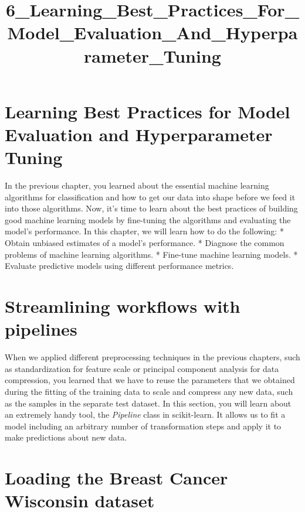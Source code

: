 \documentclass[11pt]{article}
\title{6\_Learning\_Best\_Practices\_For\_Model\_Evaluation\_And\_Hyperparameter\_Tuning}
\begin{document}
    
    
    \maketitle
    
    

    
    \section{Learning Best Practices for Model Evaluation and Hyperparameter
Tuning}\label{learning-best-practices-for-model-evaluation-and-hyperparameter-tuning}

    In the previous chapter, you learned about the essential machine
learning algorithms for classification and how to get our data into
shape before we feed it into those algorithms. Now, it's time to learn
about the best practices of building good machine learning models by
fine-tuning the algorithms and evaluating the model's performance. In
this chapter, we will learn how to do the following: * Obtain unbiased
estimates of a model's performance. * Diagnose the common problems of
machine learning algorithms. * Fine-tune machine learning models. *
Evaluate predictive models using different performance metrics.

    \section{Streamlining workflows with
pipelines}\label{streamlining-workflows-with-pipelines}

    When we applied different preprocessing techniques in the previous
chapters, such as standardization for feature scale or principal
component analysis for data compression, you learned that we have to
reuse the parameters that we obtained during the fitting of the training
data to scale and compress any new data, such as the samples in the
separate test dataset. In this section, you will learn about an
extremely handy tool, the \emph{Pipeline} class in scikit-learn. It
allows us to fit a model including an arbitrary number of transformation
steps and apply it to make predictions about new data.

    \section{Loading the Breast Cancer Wisconsin
dataset}\label{loading-the-breast-cancer-wisconsin-dataset}
\end{document}
